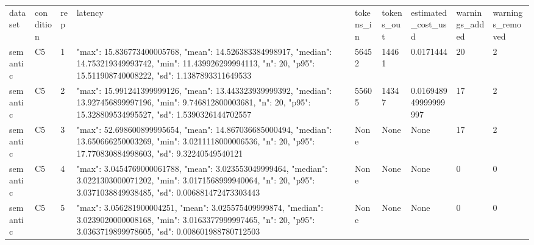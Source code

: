 \begin{tabular}{lllllllll}
dataset & condition & rep & latency & tokens\_in & tokens\_out & estimated\_cost\_usd & warnings\_added & warnings\_removed \\
semantic & C5 & 1 & {"max": 15.836773400005768, "mean": 14.526383384998917, "median": 14.753219349993742, "min": 11.439926299994113, "n": 20, "p95": 15.511908740008222, "sd": 1.1387893311649533} & 56452 & 14461 & 0.0171444 & 20 & 2 \\
semantic & C5 & 2 & {"max": 15.991241399999126, "mean": 13.443323939999392, "median": 13.927456899997196, "min": 9.746812800003681, "n": 20, "p95": 15.328809534995527, "sd": 1.5390326144702557} & 55605 & 14347 & 0.016948949999999997 & 17 & 2 \\
semantic & C5 & 3 & {"max": 52.698600899995654, "mean": 14.867036685000494, "median": 13.650666250003269, "min": 3.0211118000006536, "n": 20, "p95": 17.770830884998603, "sd": 9.32240549540121} & None & None & None & 17 & 2 \\
semantic & C5 & 4 & {"max": 3.0454769000061788, "mean": 3.023553049999464, "median": 3.0221303000071202, "min": 3.0171568999940064, "n": 20, "p95": 3.0371038849938485, "sd": 0.006881472473303443} & None & None & None & 0 & 0 \\
semantic & C5 & 5 & {"max": 3.056281900004251, "mean": 3.025575409999874, "median": 3.0239020000008168, "min": 3.0163377999997465, "n": 20, "p95": 3.0363719899978605, "sd": 0.008601988780712503} & None & None & None & 0 & 0 \\
\end{tabular}